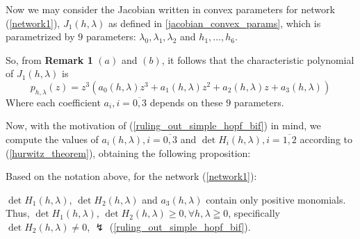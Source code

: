 Now we may consider the Jacobian written in convex parameters for network (\ref{network1}), $J_1(h,\lambda)$ as defined in \ref{jacobian_convex_params}, which is parametrized by $9$ parameters: $\lambda_0, \lambda_1, \lambda_2$ and $h_1, \ldots, h_6$.

So, from \textbf{Remark 1} $(a)$ and $(b)$, it follows that the characteristic polynomial of $J_1(h, \lambda)$ is
\[
	p_{h,\lambda}(z) = z^3 (a_0(h,\lambda) z^3 + a_1(h, \lambda)z^2 + a_2 (h,\lambda)z + a_3(h,\lambda) )
\]
Where each coefficient $a_i, i = \overline{0,3}$ depends on these $9$ parameters.

Now, with the motivation of (\ref{ruling_out_simple_hopf_bif}) in mind, we compute the values of $a_i(h,\lambda), i = \overline{0,3}$ and $\det H_i(h,\lambda), i = \overline{1,2}$ according to (\ref{hurwitz_theorem}), obtaining the following proposition:
\begin{proposition}
	Based on the notation above, for the network (\ref{network1}):

	$\det H_1(h,\lambda)$, $\det H_2(h,\lambda)$ and $a_3(h,\lambda)$ contain only positive monomials. Thus, $\det H_1(h,\lambda)$, $\det H_2(h,\lambda) \geq 0, \forall h, \lambda \geqq 0$, specifically $\det H_2(h,\lambda) \neq 0$, $\lightning$ (\ref{ruling_out_simple_hopf_bif}).
\end{proposition}
